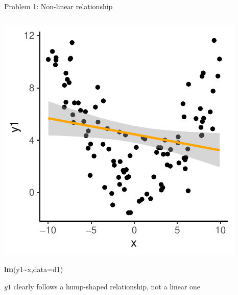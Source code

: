 \documentclass[
  ignorenonframetext,
  aspectratio=169]{beamer}
\newenvironment{Shaded}{\begin{snugshade}}{\end{snugshade}}
\newcommand{\AttributeTok}[1]{\textcolor[rgb]{0.13,0.29,0.53}{#1}}
\newcommand{\FunctionTok}[1]{\textcolor[rgb]{0.13,0.29,0.53}{\textbf{#1}}}
\newcommand{\NormalTok}[1]{#1}
\newcommand{\SpecialCharTok}[1]{\textcolor[rgb]{0.81,0.36,0.00}{\textbf{#1}}}
\let\oldShaded\Shaded %
\let\endoldShaded\endShaded
\renewenvironment{Shaded}{\scriptsize\oldShaded}{\endoldShaded}
\begin{document}
\begin{frame}[fragile]{Problem 1: Non-linear relationship}
\protect\hypertarget{problem-1-non-linear-relationship}{}
\begin{columns}[T]
\begin{column}{0.48\textwidth}
\includegraphics{03-Lecture_files/figure-beamer/unnamed-chunk-27-1.pdf}

\begin{Shaded}
\begin{Highlighting}[]
\FunctionTok{lm}\NormalTok{(y1}\SpecialCharTok{\textasciitilde{}}\NormalTok{x,}\AttributeTok{data=}\NormalTok{d1)}
\end{Highlighting}
\end{Shaded}

\(y1\) clearly follows a hump-shaped relationship, not a linear one
\end{column}


\end{columns}
\end{frame}
\end{document}
